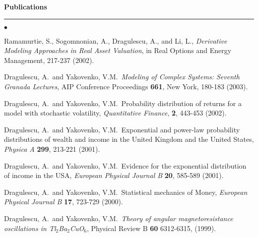 \documentclass[12pt]{article}
\begin{document}
\large\textsf{\textbf {Publications}}

\vspace*{-8pt}
\noindent
\rule{165mm}{0.5mm}
\normalfont\normalsize
\vspace*{-12pt}
\begin{list}{$\bullet$}
   {\setlength{\itemsep}{0ex}
    \setlength{\parsep}{1ex}} 
  \item Ramamurtie, S., Sogomnonian, A., Dragulescu, A., and Li, L.,
  {\it Derivative Modeling Approaches in Real Asset Valuation}, in Real
  Options and Energy Management, 217-237 (2002). 

  \item Dragulescu, A.\ and Yakovenko, V.M.\, {\it Modeling of Complex
  Systems: Seventh Granada Lectures}, AIP Conference Proceedings {\bf 661},
  New York, 180-183 (2003).

  \item Dragulescu, A.\ and Yakovenko, V.M.\, Probability distribution
  of returns for a model with stochastic volatility, {\it Quantitative
  Finance}, {\bf 2}, 443-453 (2002).

  \item Dragulescu, A.\ and Yakovenko, V.M.\, Exponential and power-law
  probability distributions of wealth and income in the United Kingdom
  and the United States, {\it Physica A} {\bf 299}, 213-221 (2001).

  \item Dragulescu, A.\ and Yakovenko, V.M.\, Evidence for the
  exponential distribution of income in the USA, {\it European
  Physical Journal B} {\bf 20}, 585-589 (2001).

  \item Dragulescu, A.\ and Yakovenko, V.M.\, Statistical mechanics of
  Money, {\it European Physical Journal B} {\bf 17}, 723-729 (2000).

  \item Dragulescu, A.\ and Yakovenko, V.M.\, {\it Theory of angular
  magnetoresistance oscillations in Tl$_2$Ba$_2$CuO$_6$}, Physical
  Review B {\bf 60} 6312-6315, (1999).
\end{list}
\end{document}
